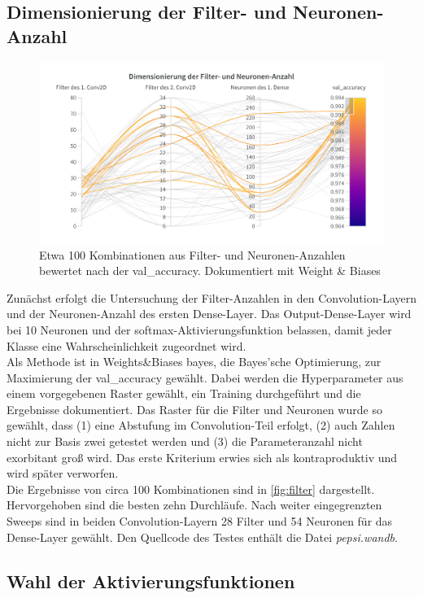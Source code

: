 \documentclass[
fontsize=12pt,					%
paper=a4,						%
twoside=false, 					%
listof=totoc, 					%
bibliography=totoc,				%
titlepage, 						%
headsepline, 					%
DIV=12,							%
BCOR=6mm,						%
cleardoublepage=empty,			%
parskip,							%
ngerman
]{scrartcl}
\begin{document}
\subsection{Dimensionierung der Filter- und Neuronen-Anzahl}

\begin{figure}
	\centering
	\includegraphics[width=0.7\linewidth]{images/Filter}
	\caption{Etwa 100 Kombinationen aus Filter- und Neuronen-Anzahlen bewertet nach der val\_accuracy. Dokumentiert mit Weight \& Biases}
	\label{fig:filter}
\end{figure}

Zunächst erfolgt die Untersuchung der Filter-Anzahlen in den Convolution-Layern und der Neuronen-Anzahl des ersten Dense-Layer. Das Output-Dense-Layer wird bei 10 Neuronen und der softmax-Aktivierungsfunktion belassen, damit jeder Klasse eine Wahrscheinlichkeit zugeordnet wird.\\
Als Methode ist in Weights\&Biases bayes, die Bayes'sche Optimierung, zur Maximierung der val\_accuracy gewählt. Dabei werden die Hyperparameter aus einem vorgegebenen Raster gewählt, ein Training durchgeführt und die Ergebnisse dokumentiert. Das Raster für die Filter und Neuronen wurde so gewählt, dass (1) eine Abstufung im Convolution-Teil erfolgt, (2) auch Zahlen nicht zur Basis zwei getestet werden und (3) die Parameteranzahl nicht exorbitant groß wird. Das erste Kriterium erwies sich als kontraproduktiv und wird später verworfen.\\
Die Ergebnisse von circa 100 Kombinationen sind in \autoref{fig:filter} dargestellt. Hervorgehoben sind die besten zehn Durchläufe. Nach weiter eingegrenzten Sweeps sind in beiden Convolution-Layern 28 Filter und 54 Neuronen für das Dense-Layer gewählt. Den Quellcode des Testes enthält die Datei \emph{pepsi.wandb}.\\

\subsection{Wahl der Aktivierungsfunktionen}
\end{document}

